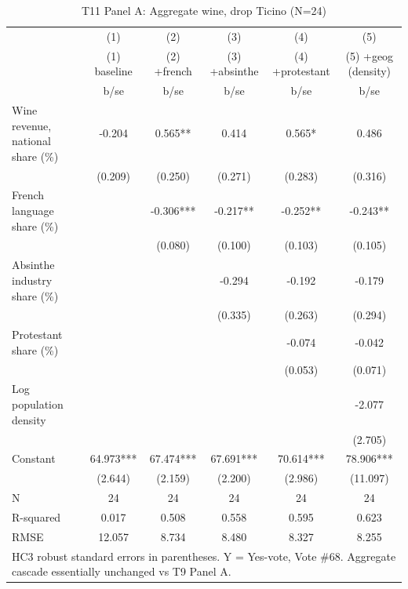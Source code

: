 \begin{table}[htbp]\centering
\def\sym#1{\ifmmode^{#1}\else\(^{#1}\)\fi}
\caption{T11 Panel A: Aggregate wine, drop Ticino (N=24) \label{tab:T11\_A}}
\begin{tabular}{l*{5}{c}}
\toprule
            &\multicolumn{1}{c}{(1)}&\multicolumn{1}{c}{(2)}&\multicolumn{1}{c}{(3)}&\multicolumn{1}{c}{(4)}&\multicolumn{1}{c}{(5)}\\
            &\multicolumn{1}{c}{(1) baseline}&\multicolumn{1}{c}{(2) +french}&\multicolumn{1}{c}{(3) +absinthe}&\multicolumn{1}{c}{(4) +protestant}&\multicolumn{1}{c}{(5) +geog (density)}\\
            &        b/se   &        b/se   &        b/se   &        b/se   &        b/se   \\
\midrule
Wine revenue, national share (\%)&      -0.204   &       0.565** &       0.414   &       0.565*  &       0.486   \\
            &     (0.209)   &     (0.250)   &     (0.271)   &     (0.283)   &     (0.316)   \\
French language share (\%)&               &      -0.306***&      -0.217** &      -0.252** &      -0.243** \\
            &               &     (0.080)   &     (0.100)   &     (0.103)   &     (0.105)   \\
Absinthe industry share (\%)&               &               &      -0.294   &      -0.192   &      -0.179   \\
            &               &               &     (0.335)   &     (0.263)   &     (0.294)   \\
Protestant share (\%)&               &               &               &      -0.074   &      -0.042   \\
            &               &               &               &     (0.053)   &     (0.071)   \\
Log population density&               &               &               &               &      -2.077   \\
            &               &               &               &               &     (2.705)   \\
Constant    &      64.973***&      67.474***&      67.691***&      70.614***&      78.906***\\
            &     (2.644)   &     (2.159)   &     (2.200)   &     (2.986)   &    (11.097)   \\
\midrule
N           &          24   &          24   &          24   &          24   &          24   \\
R-squared   &       0.017   &       0.508   &       0.558   &       0.595   &       0.623   \\
RMSE        &      12.057   &       8.734   &       8.480   &       8.327   &       8.255   \\
\bottomrule
\multicolumn{6}{l}{\footnotesize HC3 robust standard errors in parentheses.  Y = Yes-vote, Vote \#68.  Aggregate cascade essentially unchanged vs T9 Panel A.}\\
\end{tabular}
\end{table}
